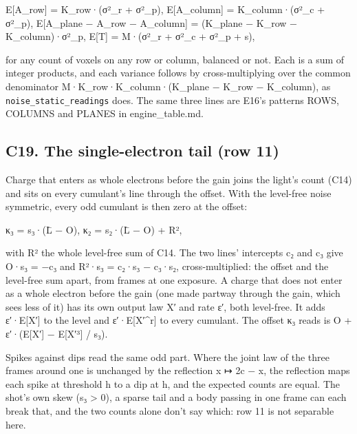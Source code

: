 E[A\_\allowbreak{}row] = K\_\allowbreak{}row·(σ²\_\allowbreak{}r + σ²\_\allowbreak{}p),  E[A\_\allowbreak{}column] = K\_\allowbreak{}column·(σ²\_\allowbreak{}c + σ²\_\allowbreak{}p), E[A\_\allowbreak{}plane − A\_\allowbreak{}row − A\_\allowbreak{}column] = (K\_\allowbreak{}plane − K\_\allowbreak{}row − K\_\allowbreak{}column)·σ²\_\allowbreak{}p,  E[T] = M·(σ²\_\allowbreak{}r + σ²\_\allowbreak{}c + σ²\_\allowbreak{}p + s),

for any count of voxels on any row or column, balanced or not. Each is a sum of integer products, and each variance follows by cross-multiplying over the common denominator M·K\_\allowbreak{}row·K\_\allowbreak{}column·(K\_\allowbreak{}plane − K\_\allowbreak{}row − K\_\allowbreak{}column), as \texttt{noise\_\allowbreak{}static\_\allowbreak{}readings} does. The same three lines are E16's patterns ROWS, COLUMNS and PLANES in engine\_\allowbreak{}table.md.

\subsection{\texorpdfstring{C19. The single-electron tail (row 11)}{C19. The single-electron tail (row 11)}}

Charge that enters as whole electrons before the gain joins the light's count (C14) and sits on every cumulant's line through the offset. With the level-free noise symmetric, every odd cumulant is then zero at the offset:

κ₃ = s₃·(L̄ − O),  κ₂ = s₂·(L̄ − O) + R²,

with R² the whole level-free sum of C14. The two lines' intercepts c₂ and c₃ give O·s₃ = −c₃ and R²·s₃ = c₂·s₃ − c₃·s₂, cross-multiplied: the offset and the level-free sum apart, from frames at one exposure. A charge that does not enter as a whole electron before the gain (one made partway through the gain, which sees less of it) has its own output law X′ and rate ε′, both level-free. It adds ε′·E[X′] to the level and ε′·E[X′\textasciicircum{}r] to every cumulant. The offset κ₃ reads is O + ε′·(E[X′] − E[X′³] / s₃).

Spikes against dips read the same odd part. Where the joint law of the three frames around one is unchanged by the reflection x ↦ 2c − x, the reflection maps each spike at threshold h to a dip at h, and the expected counts are equal. The shot's own skew (s₃ > 0), a sparse tail and a body passing in one frame can each break that, and the two counts alone don't say which: row 11 is not separable here.

